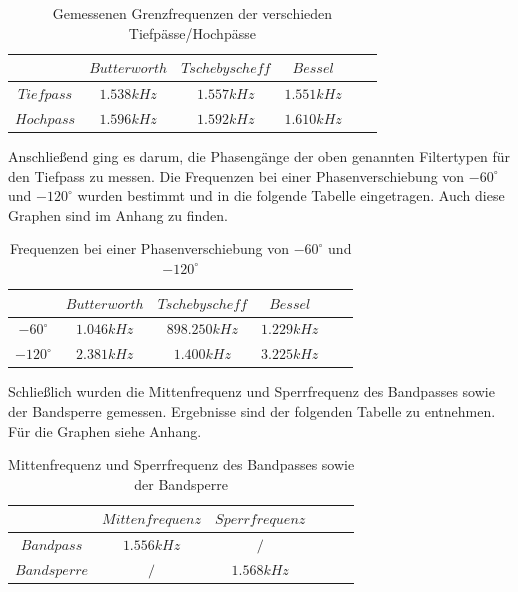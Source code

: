 	\begin{table}[h]
		\centering
		\begin{tabular}{c|c|c|c|c|c}
			$ $        & $Butterworth$ & $Tschebyscheff$ & $Bessel$  \\
			\hline
			$Tiefpass$ & $1.538kHz$    & $1.557kHz$      & $1.551kHz$  \\
			$Hochpass$ & $1.596kHz$    & $1.592kHz$      & $1.610kHz$  \\   
		\end{tabular}
		\caption{Gemessenen Grenzfrequenzen der verschieden Tiefpässe/Hochpässe}
		\label{tab:grenzfrequnzen_hp_tp}
	\end{table}
	
\noindent Anschließend ging es darum, die Phasengänge der oben genannten Filtertypen für den Tiefpass zu messen. Die Frequenzen bei einer Phasenverschiebung von $-60^\circ$ und $-120^\circ$ wurden bestimmt und in die folgende Tabelle eingetragen. Auch diese Graphen sind im Anhang zu finden.

\begin{table}[h]
	\centering
		\begin{tabular}{c|c|c|c|c|c}
			$ $           & $Butterworth$ & $Tschebyscheff$ & $Bessel$  \\
			\hline		
		    $-60^\circ $ & $1.046kHz$    & $898.250kHz$    & $1.229kHz$  \\
			$-120^\circ$ & $2.381kHz$    & $1.400kHz$      & $3.225kHz$  \\   
	\end{tabular}
	\caption{Frequenzen bei einer Phasenverschiebung von $-60^\circ$ und $-120^\circ$ }
	\label{tab:phasenverschiebung_hp_tp}
\end{table}
	
\noindent Schließlich wurden die Mittenfrequenz und Sperrfrequenz des Bandpasses sowie der Bandsperre gemessen. Ergebnisse sind der folgenden Tabelle zu entnehmen. Für die Graphen siehe Anhang.

\begin{table}[h]
	\centering
	\begin{tabular}{c|c|c|c|c|c}
		$ $          & $Mittenfrequenz$ & $Sperrfrequenz$  \\
		\hline
		$Bandpass$   & $1.556kHz$       & $/$         \\
		$Bandsperre$ & $/$              & $1.568kHz$  \\   
	\end{tabular}
	\caption{Mittenfrequenz und Sperrfrequenz des Bandpasses sowie der Bandsperre}
	\label{tab:grenzfrequnzen_bs_bp}
\end{table}

